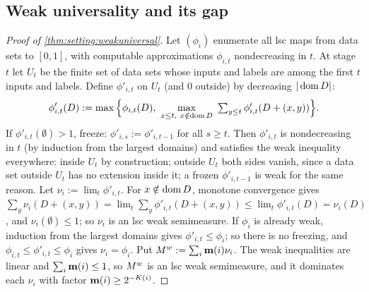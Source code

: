 \subsection{Weak universality and its gap}\label{app:setting:weak}

\begin{proof}[Proof of \cref{thm:setting:weakuniversal}]
Let $(\phi_i)$ enumerate all lsc maps from data sets to $[0,1]$, with computable approximations $\phi_{i,t}$ nondecreasing in $t$. At stage $t$ let $U_t$ be the finite set of data sets whose inputs and labels are among the first $t$ inputs and labels. Define $\phi'_{i,t}$ on $U_t$ (and $0$ outside) by decreasing $|\operatorname{dom} D|$:
\[
\phi'_{i,t}(D):=\max\Big\{\phi_{i,t}(D),\ \max_{x\le t,\ x\notin\dom D}\ \textstyle\sum_{y\le t}\phi'_{i,t}(D+(x,y))\Big\}.
\]
If $\phi'_{i,t}(\emptyset)>1$, freeze: $\phi'_{i,s}:=\phi'_{i,t-1}$ for all $s\ge t$. Then $\phi'_{i,t}$ is nondecreasing in $t$ (by induction from the largest domains) and satisfies the weak inequality everywhere: inside $U_t$ by construction; outside $U_t$ both sides vanish, since a data set outside $U_t$ has no extension inside it; a frozen $\phi'_{i,t-1}$ is weak for the same reason. Let $\nu_i:=\lim_t\phi'_{i,t}$. For $x\notin\operatorname{dom} D$, monotone convergence gives $\sum_y\nu_i(D+(x,y))=\lim_t\sum_y\phi'_{i,t}(D+(x,y))\le\lim_t\phi'_{i,t}(D)=\nu_i(D)$, and $\nu_i(\emptyset)\le1$; so $\nu_i$ is an lsc weak semimeasure. If $\phi_i$ is already weak, induction from the largest domains gives $\phi'_{i,t}\le\phi_i$; so there is no freezing, and $\phi_{i,t}\le\phi'_{i,t}\le\phi_i$ gives $\nu_i=\phi_i$. Put $M^{w}:=\sum_i\mathbf{m}(i)\nu_i$. The weak inequalities are linear and $\sum_i\mathbf{m}(i)\le1$, so $M^{w}$ is an lsc weak semimeasure, and it dominates each $\nu_i$ with factor $\mathbf{m}(i)\ge2^{-K(i)}$.
\end{proof}


